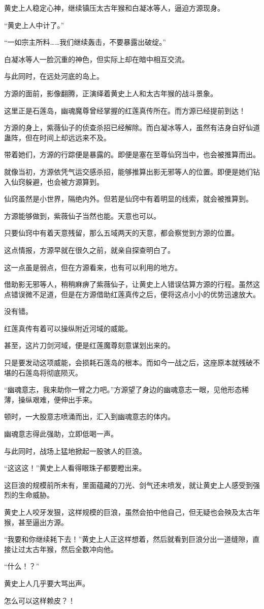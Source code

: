\begin{this_body}
黄史上人稳定心神，继续镇压太古年猴和白凝冰等人，逼迫方源现身。

“黄史上人中计了。”

“一如宗主所料……我们继续轰击，不要暴露出破绽。”

白凝冰等人一脸沉重的神色，但实际上却在暗中相互交流。

与此同时，在远处河底的岛上。

方源的面前，影像翻腾，正演绎着黄史上人和太古年猴的战斗景象。

这里正是石莲岛，幽魂魔尊曾经掌握的红莲真传所在。而方源已经提前到达！

方源的身上，紫薇仙子的侦查杀招已经解除。而白凝冰等人，虽然有洁身自好仙道蛊阵，但在时间上却远远来不及。

带着她们，方源的行踪便是暴露的。即便是塞在至尊仙窍当中，也会被推算而出。

就像当初，方源依凭气运交感杀招，能够推算出影无邪等人的位置。即便是她们钻入仙窍躲避，也会被方源算到。

仙窍虽然是小世界，隔绝内外。但若是仙窍中有着明显的线索，就会被推算到。

方源能够做到，紫薇仙子当然也能。天意也可以。

只要仙窍中有着天意残留，那么五域两天的天意，都会察觉到方源的位置。

这点情报，方源早就在很久之前，就亲自探查明白了。

这一点虽是弱点，但在方源看来，也有可以利用的地方。

借助影无邪等人，稍稍麻痹了紫薇仙子，让黄史上人错误估算方源的行程。虽然这点错误微不足道，但是在方源借助红莲真传之后，便将这点小小的优势迅速放大。

没有错。

红莲真传有着可以操纵附近河域的威能。

甚至，这片刀剑河域，便是红莲魔尊刻意谋划出来的。

只是要发动这项威能，会损耗石莲岛的根本。而如今一战之后，这座原本就残破不堪的石莲岛将彻底陨灭。

“幽魂意志，我来助你一臂之力吧。”方源望了身边的幽魂意志一眼，见他形态稀薄，操纵艰难，便伸出手来。

顿时，一大股意志喷涌而出，汇入到幽魂意志的体内。

幽魂意志得此强助，立即低喝一声。

与此同时，战场上猛地掀起一股骇人的巨浪。

“这这这！”黄史上人看得眼珠子都要瞪出来。

这巨浪的规模前所未有，里面蕴藏的刀光、剑气还未喷发，就让黄史上人感受到强烈的生命威胁。

黄史上人咬牙发狠，这样规模的巨浪，虽然会拍中他自己，但无疑也会殃及太古年猴，甚至逼出方源。

“我要和你继续耗下去！”黄史上人正这样想着，然后就看到巨浪分出一道缝隙，直接让过太古年猴，然后全数冲向他。

“什么！？”

黄史上人几乎要大骂出声。

怎么可以这样赖皮？！

\end{this_body}

